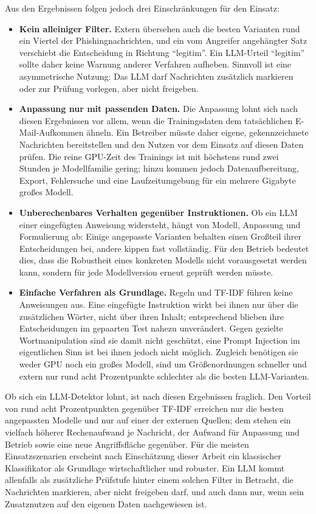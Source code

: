 \documentclass[12pt,twoside=false,a4paper,parskip]{scrbook}
\begin{document}
Aus den Ergebnissen folgen jedoch drei Einschränkungen für den Einsatz:

\begin{itemize}
\item \textbf{Kein alleiniger Filter.} Extern übersehen auch die besten Varianten rund ein Viertel der Phishingnachrichten, und ein vom Angreifer angehängter Satz verschiebt die Entscheidung in Richtung \enquote{legitim}. Ein LLM-Urteil \enquote{legitim} sollte daher keine Warnung anderer Verfahren aufheben. Sinnvoll ist eine asymmetrische Nutzung: Das LLM darf Nachrichten zusätzlich markieren oder zur Prüfung vorlegen, aber nicht freigeben.
\item \textbf{Anpassung nur mit passenden Daten.} Die Anpassung lohnt sich nach diesen Ergebnissen vor allem, wenn die Trainingsdaten dem tatsächlichen E-Mail-Aufkommen ähneln. Ein Betreiber müsste daher eigene, gekennzeichnete Nachrichten bereitstellen und den Nutzen vor dem Einsatz auf diesen Daten prüfen. Die reine GPU-Zeit des Trainings ist mit höchstens rund zwei Stunden je Modellfamilie gering; hinzu kommen jedoch Datenaufbereitung, Export, Fehlersuche und eine Laufzeitumgebung für ein mehrere Gigabyte großes Modell.
\item \textbf{Unberechenbares Verhalten gegenüber Instruktionen.} Ob ein LLM einer eingefügten Anweisung widersteht, hängt von Modell, Anpassung und Formulierung ab: Einige angepasste Varianten behalten einen Großteil ihrer Entscheidungen bei, andere kippen fast vollständig. Für den Betrieb bedeutet dies, dass die Robustheit eines konkreten Modells nicht vorausgesetzt werden kann, sondern für jede Modellversion erneut geprüft werden müsste.
\item \textbf{Einfache Verfahren als Grundlage.} Regeln und TF-IDF führen keine Anweisungen aus. Eine eingefügte Instruktion wirkt bei ihnen nur über die zusätzlichen Wörter, nicht über ihren Inhalt; entsprechend blieben ihre Entscheidungen im gepaarten Test nahezu unverändert. Gegen gezielte Wortmanipulation sind sie damit nicht geschützt, eine Prompt Injection im eigentlichen Sinn ist bei ihnen jedoch nicht möglich. Zugleich benötigen sie weder GPU noch ein großes Modell, sind um Größenordnungen schneller und extern nur rund acht Prozentpunkte schlechter als die besten LLM-Varianten.
\end{itemize}

Ob sich ein LLM-Detektor lohnt, ist nach diesen Ergebnissen fraglich. Den Vorteil von rund acht Prozentpunkten gegenüber TF-IDF erreichen nur die besten angepassten Modelle und nur auf einer der externen Quellen; dem stehen ein vielfach höherer Rechenaufwand je Nachricht, der Aufwand für Anpassung und Betrieb sowie eine neue Angriffsfläche gegenüber. Für die meisten Einsatzszenarien erscheint nach Einschätzung dieser Arbeit ein klassischer Klassifikator als Grundlage wirtschaftlicher und robuster. Ein LLM kommt allenfalls als zusätzliche Prüfstufe hinter einem solchen Filter in Betracht, die Nachrichten markieren, aber nicht freigeben darf, und auch dann nur, wenn sein Zusatznutzen auf den eigenen Daten nachgewiesen ist.
\end{document}
